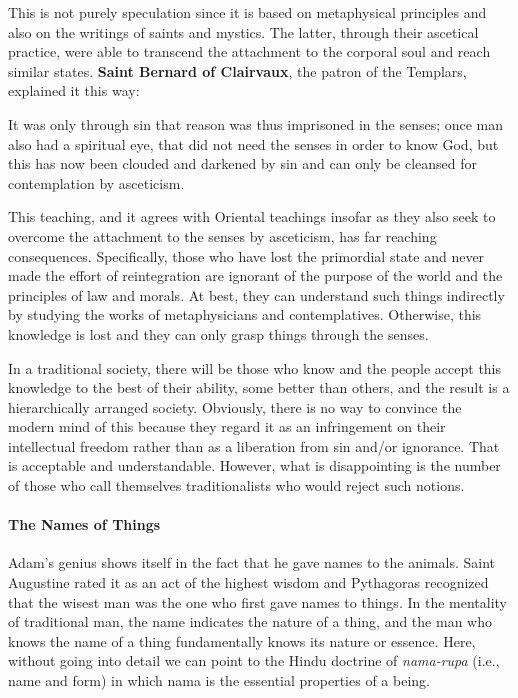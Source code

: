 This is not purely speculation since it is based on metaphysical principles and also on the writings of saints and mystics. The latter, through their ascetical practice, were able to transcend the attachment to the corporal soul and reach similar states. \textbf{Saint Bernard of Clairvaux}, the patron of the Templars, explained it this way:

\begin{quotex}
It was only through sin that reason was thus imprisoned in the senses; once man also had a spiritual eye, that did not need the senses in order to know God, but this has now been clouded and darkened by sin and can only be cleansed for contemplation by asceticism.

\end{quotex}
This teaching, and it agrees with Oriental teachings insofar as they also seek to overcome the attachment to the senses by asceticism, has far reaching consequences. Specifically, those who have lost the primordial state and never made the effort of reintegration are ignorant of the purpose of the world and the principles of law and morals. At best, they can understand such things indirectly by studying the works of metaphysicians and contemplatives. Otherwise, this knowledge is lost and they can only grasp things through the senses.

In a traditional society, there will be those who know and the people accept this knowledge to the best of their ability, some better than others, and the result is a hierarchically arranged society. Obviously, there is no way to convince the modern mind of this because they regard it as an infringement on their intellectual freedom rather than as a liberation from sin and/or ignorance. That is acceptable and understandable. However, what is disappointing is the number of those who call themselves traditionalists who would reject such notions.

\paragraph{The Names of Things}
Adam's genius shows itself in the fact that he gave names to the animals. Saint Augustine rated it as an act of the highest wisdom and Pythagoras recognized that the wisest man was the one who first gave names to things. In the mentality of traditional man, the name indicates the nature of a thing, and the man who knows the name of a thing fundamentally knows its nature or essence. Here, without going into detail we can point to the Hindu doctrine of \emph{nama-rupa} (i.e., name and form) in which nama is the essential properties of a being.

